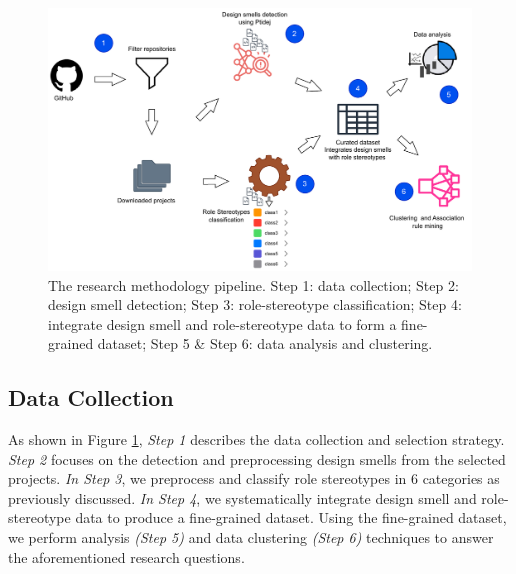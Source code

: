 \documentclass[AMA,Times1COL]{WileyNJDv5} %
\begin{document}
\begin{figure}[b]
	\centering
	\includegraphics[scale=0.7]{figures/research_design.pdf}
	\caption[Methodology Pipeline]{The research methodology pipeline. Step 1: data collection; Step 2: design smell detection; Step 3: role-stereotype classification; Step 4: integrate design smell and role-stereotype data to form a fine-grained dataset; Step 5 \& Step 6: data analysis and clustering.}
	\label{fig:conceptualfw}
\end{figure}

\subsection{Data Collection}
As shown in Figure \ref{fig:conceptualfw}, \textit{Step 1} describes the data collection and selection strategy. \textit{Step 2} focuses on the detection and preprocessing design smells from the selected projects. \textit{In Step 3}, we preprocess and classify role stereotypes in 6 categories as previously discussed. \textit{In Step 4}, we systematically integrate design smell and role-stereotype data to produce a fine-grained dataset. Using the fine-grained dataset, we perform analysis \textit{(Step 5)} and data clustering \textit{(Step 6)} techniques to answer the aforementioned research questions.
\end{document}
